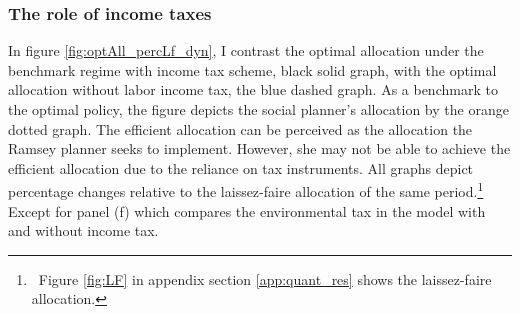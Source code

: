 

\subsubsection{The role of income taxes}\label{subsec:notaul}



In figure \ref{fig:optAll_percLf_dyn}, I contrast the optimal allocation under the benchmark regime with income tax scheme, black solid graph, with the optimal allocation without labor income tax, the blue dashed graph. As a benchmark to the optimal policy, the figure depicts the social planner's allocation by the orange dotted graph. %
The efficient allocation can be perceived as the allocation the Ramsey planner seeks to implement. However, she may not be able to achieve the efficient allocation due to the reliance on tax instruments.
All graphs depict percentage changes relative to the laissez-faire allocation of the same period.\footnote{\ Figure \ref{fig:LF} in appendix section \ref{app:quant_res} shows the laissez-faire allocation. } Except for panel (f) which compares the environmental tax in the model with and without income tax. 


